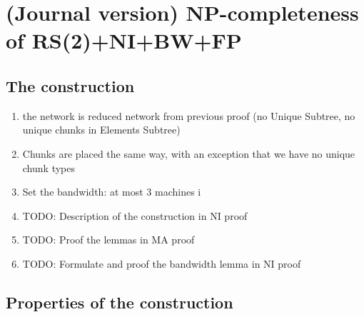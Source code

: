 \documentclass[conference,10pt]{IEEEtran}
\begin{document}
\section{(Journal version) NP-completeness of RS(2)+NI+BW+FP}

\subsection{The construction}

\begin{enumerate}
\item the network is reduced network from previous proof (no Unique Subtree, no unique chunks in Elements Subtree)
\item Chunks are placed the same way, with an exception that we have no unique chunk types
\item Set the bandwidth: at most 3 machines i
\item TODO: Description of the construction in NI proof
\item TODO: Proof the lemmas in MA proof
\item TODO: Formulate and proof the bandwidth lemma in NI proof
\end{enumerate}

\subsection{Properties of the construction}


\end{document}
